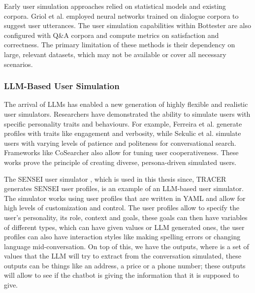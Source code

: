 Early user simulation approaches
relied on statistical models and existing corpora.
Griol et al. \autocite{griolAutomaticDialogSimulation2013}
employed neural networks trained on dialogue corpora
to suggest user utterances.
The user simulation capabilities within Bottester
\autocite{vasconcelosBottesterTestingConversational2017}
are also configured with Q\&A corpora
and compute metrics on satisfaction and correctness.
The primary limitation of these methods is
their dependency on large, relevant datasets,
which may not be available or cover all necessary scenarios.

\subsubsection{LLM-Based User Simulation}

The arrival of \acp{LLM} has enabled a new generation
of highly flexible and realistic user simulators.
Researchers have demonstrated the ability
to simulate users with specific personality traits and behaviours.
For example, Ferreira et al. \autocite{ferreiraMultitraitUserSimulation2024}
generate profiles with traits like engagement and verbosity,
while Sekulic et al. \autocite{sekulicSimulatingConversationalSearch2024}
simulate users with varying levels of patience and politeness for conversational search.
Frameworks like CoSearcher \autocite{salleStudyingEffectivenessConversational2021}
also allow for tuning user cooperativeness.
These works prove the principle of creating diverse, persona-driven simulated users.

The SENSEI user simulator \autocite{delaraAutomatedEndtoEndTesting2025, delaraSensei},
which is used in this thesis since, \ac{TRACER} generates SENSEI user profiles,
is an example of an \ac{LLM}-based user simulator.
The simulator works using user profiles
that are written in YAML
and allow for high levels of customization and control.
The user profiles allow to specify the user's
personality, its role, context and goals,
these goals can then have variables of different types,
which can have given values or \ac{LLM} generated ones,
the user profiles can also have interaction styles like
making spelling errors or changing language mid-conversation.
On top of this, we have the outputs,
where is a set of values that the \ac{LLM}
will try to extract from the conversation simulated,
these outputs can be things like an address, a price or a phone number;
these outputs will allow
to see if the chatbot is giving the information
that it is supposed to give.


